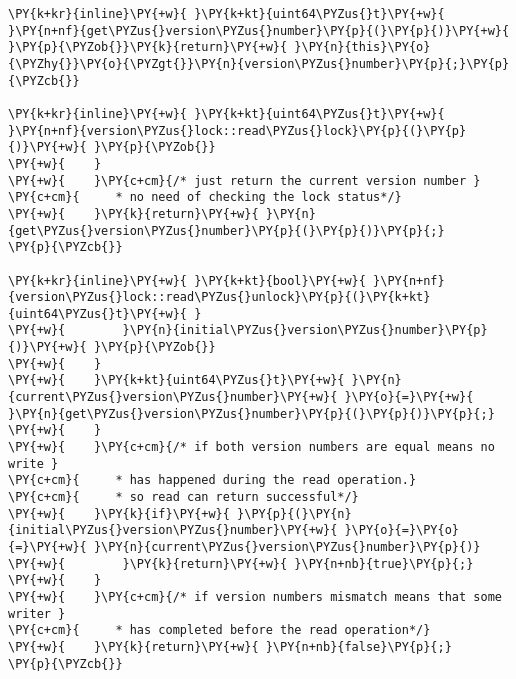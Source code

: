 \begin{Verbatim}[commandchars=\\\{\},codes={\catcode`\$=3\catcode`\^=7\catcode`\_=8\relax}]
\PY{k+kr}{inline}\PY{+w}{ }\PY{k+kt}{uint64\PYZus{}t}\PY{+w}{ }\PY{n+nf}{get\PYZus{}version\PYZus{}number}\PY{p}{(}\PY{p}{)}\PY{+w}{ }\PY{p}{\PYZob{}}\PY{k}{return}\PY{+w}{ }\PY{n}{this}\PY{o}{\PYZhy{}}\PY{o}{\PYZgt{}}\PY{n}{version\PYZus{}number}\PY{p}{;}\PY{p}{\PYZcb{}}

\PY{k+kr}{inline}\PY{+w}{ }\PY{k+kt}{uint64\PYZus{}t}\PY{+w}{ }\PY{n+nf}{version\PYZus{}lock::read\PYZus{}lock}\PY{p}{(}\PY{p}{)}\PY{+w}{ }\PY{p}{\PYZob{}}
\PY{+w}{    }
\PY{+w}{    }\PY{c+cm}{/* just return the current version number }
\PY{c+cm}{     * no need of checking the lock status*/}
\PY{+w}{    }\PY{k}{return}\PY{+w}{ }\PY{n}{get\PYZus{}version\PYZus{}number}\PY{p}{(}\PY{p}{)}\PY{p}{;}
\PY{p}{\PYZcb{}}

\PY{k+kr}{inline}\PY{+w}{ }\PY{k+kt}{bool}\PY{+w}{ }\PY{n+nf}{version\PYZus{}lock::read\PYZus{}unlock}\PY{p}{(}\PY{k+kt}{uint64\PYZus{}t}\PY{+w}{ }
\PY{+w}{        }\PY{n}{initial\PYZus{}version\PYZus{}number}\PY{p}{)}\PY{+w}{ }\PY{p}{\PYZob{}}
\PY{+w}{    }
\PY{+w}{    }\PY{k+kt}{uint64\PYZus{}t}\PY{+w}{ }\PY{n}{current\PYZus{}version\PYZus{}number}\PY{+w}{ }\PY{o}{=}\PY{+w}{ }\PY{n}{get\PYZus{}version\PYZus{}number}\PY{p}{(}\PY{p}{)}\PY{p}{;}
\PY{+w}{    }
\PY{+w}{    }\PY{c+cm}{/* if both version numbers are equal means no write }
\PY{c+cm}{     * has happened during the read operation.}
\PY{c+cm}{     * so read can return successful*/}
\PY{+w}{    }\PY{k}{if}\PY{+w}{ }\PY{p}{(}\PY{n}{initial\PYZus{}version\PYZus{}number}\PY{+w}{ }\PY{o}{=}\PY{o}{=}\PY{+w}{ }\PY{n}{current\PYZus{}version\PYZus{}number}\PY{p}{)}
\PY{+w}{        }\PY{k}{return}\PY{+w}{ }\PY{n+nb}{true}\PY{p}{;}
\PY{+w}{    }
\PY{+w}{    }\PY{c+cm}{/* if version numbers mismatch means that some writer }
\PY{c+cm}{     * has completed before the read operation*/}
\PY{+w}{    }\PY{k}{return}\PY{+w}{ }\PY{n+nb}{false}\PY{p}{;}
\PY{p}{\PYZcb{}}
\end{Verbatim}
